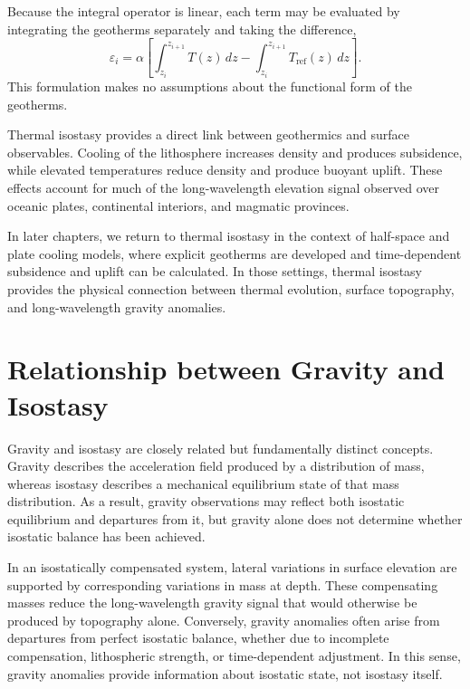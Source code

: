 Because the integral operator is linear, each term may be evaluated by integrating the geotherms separately and taking the difference,
\begin{equation}
    \varepsilon_i
    =
    \alpha
    \left[
        \int_{z_i}^{z_{i+1}} T(z)\, dz
        -
        \int_{z_i}^{z_{i+1}} T_{\mathrm{ref}}(z)\, dz
    \right].
\end{equation}
This formulation makes no assumptions about the functional form of the geotherms.

Thermal isostasy provides a direct link between geothermics and surface observables. Cooling of the lithosphere increases density and produces subsidence, while elevated temperatures reduce density and produce buoyant uplift. These effects account for much of the long-wavelength elevation signal observed over oceanic plates, continental interiors, and magmatic provinces.

In later chapters, we return to thermal isostasy in the context of half-space and plate cooling models, where explicit geotherms are developed and time-dependent subsidence and uplift can be calculated. In those settings, thermal isostasy provides the physical connection between thermal evolution, surface topography, and long-wavelength gravity anomalies.


\section{Relationship between Gravity and Isostasy}

Gravity and isostasy are closely related but fundamentally distinct concepts.  Gravity describes the acceleration field produced by a distribution of mass, whereas isostasy describes a mechanical equilibrium state of that mass distribution.  As a result, gravity observations may reflect both isostatic equilibrium and departures from it, but gravity alone does not determine whether isostatic balance has been achieved.

In an isostatically compensated system, lateral variations in surface elevation are supported by corresponding variations in mass at depth.  These compensating masses reduce the long-wavelength gravity signal that would otherwise be produced by topography alone.  Conversely, gravity anomalies often arise from departures from perfect isostatic balance, whether due to incomplete compensation, lithospheric strength, or time-dependent adjustment.  In this sense, gravity anomalies provide information about isostatic state, not isostasy itself.

